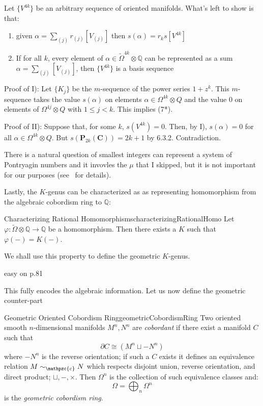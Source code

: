 \documentclass{book}
\newcommand{\Q}{{\mathbb{Q}}}
\newcommand{\cc}{{\mathpzc{c}}}
\let\temp\phi
\let\phi\varphi
\let\varphi\temp
\newcommand{\dcup}{\sqcup}
\begin{document}
\begin{Proof}
  Let $\{V^{4k}\}$ be an arbitrary sequence of oriented manifolds. What's left to show is that:
  \begin{enumerate}
    \item given $\alpha = \sum_{(j)} r_{(j)}[V_{(j)}]$ then $s(\alpha) = r_ks[V^{4k}]$
    \item If for all $k$, every element of $\alpha \in \widetilde{\Omega}^{4k} \otimes \Q$ can be represented
      as a sum $\alpha = \sum_{(j)}[V_{(j)}]$, then $\{V^{4k}\}$ is a basis sequence
  \end{enumerate}

Proof of I): Let $\{K_j\}$ be the $m$-sequence of the power series $1 + z^k$. This $m$-sequence takes the value $s(\alpha)$ on elements $\alpha \in \Omega^{4k} \otimes Q$ and the value $0$ on elements of $\Omega^{4j} \otimes Q$ with $1 \leq j < k$. This implies (7*).

Proof of II): Suppose that, for some $k$, $s(V^{4k}) = 0$. Then, by I), $s(\alpha) = 0$ for all $\alpha \in \Omega^{4k} \otimes Q$. But $s(\mathbf{P}_{2k}(\mathbf{C})) = 2k + 1$ by {\color{red} 6.3.2}. Contradiction.

\end{Proof}

There is a natural question of smallest integers can represent a system of Pontryagin numbers and it invovles
the $\mu$ that I skipped, but it is not important for our purposes
(see~\cite[section~6.4]{hirzebruchTopologicalMethodsAlgebraic1995} for details).

Lastly, the $K$-genus can be characterized as as representing homomorphism from the algebraic cobordism ring to
$\Q$:

\begin{thm}{Characterizing Rational Homomorphisms}{characterizingRationalHomo}
  Let $\phi: \widetilde{\Omega}\otimes \Q \to \Q$ be a homomorphism. Then there exists a $K$ such that
  $\phi(-) = K(-)$.
\end{thm}

We shall use this property to define the geometric $K$-genus.

\begin{Proof}
  easy on p.81
\end{Proof}

This fully encodes the algebraic information. Let us now define the geometric counter-part

\begin{defn}{Geometric Oriented Cobordism Ring}{geometricCobordismRing}
  Two oriented smooth $n$-dimensional manifolds $M^n, N^n$ are \emph{cobordant} if there exist a manifold $C$ such that
  \[
    \partial C \cong (M^n \dcup  -N^n)
  \]
  where $-N^n$ is the reverse orientation; if such a $C$ exists it defines an equivalence relation $M\sim_\cc
  N$ which respects disjoint union, reverse orientation, and direct product; $\dcup, -, \times$. Then
  $\Omega^n$ is the collection of such equivalence classes and:
  \[
    \Omega = \bigoplus_n \Omega^n
  \]
  is the \emph{geometric cobordism ring}.
\end{defn}
\end{document}
